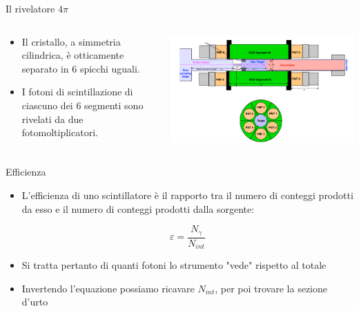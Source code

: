 \documentclass [xcolor=svgnames] {beamer}
\begin{document}
\begin{frame}{Il rivelatore $4\pi$}
	\begin{columns}
		\begin{column}{0.45\textwidth}
			\begin{itemize}
				\item Il cristallo, a simmetria cilindrica, è otticamente separato in 6 spicchi uguali.
				\item I fotoni di scintillazione di ciascuno dei 6 segmenti sono rivelati da due fotomoltiplicatori.
			\end{itemize}
		\end{column}
		\begin{column}{0.45\textwidth}
			\centering
			\includegraphics[width=\textwidth]{img/BGO.png}
		\end{column}
	\end{columns}
\end{frame}


\begin{frame}{Efficienza}
	\begin{itemize}
		\item L'efficienza di uno scintillatore è il rapporto tra il numero di conteggi prodotti da esso e il numero di conteggi prodotti dalla sorgente:
		
		\begin{equation}
			\varepsilon = \dfrac{N_{\gamma}}{N_{int}}
		\end{equation}
		
		\item Si tratta pertanto di quanti fotoni lo strumento "vede" rispetto al totale
		\item Invertendo l'equazione possiamo ricavare $N_{int}$, per poi trovare la sezione d'urto
	\end{itemize}
\end{frame}
\end{document}
